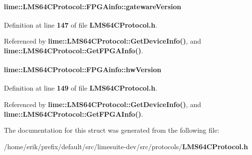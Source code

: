 \paragraph[{gateware\+Version}]{ lime\+::\+L\+M\+S64\+C\+Protocol\+::\+F\+P\+G\+Ainfo\+::gateware\+Version}\label{structlime_1_1LMS64CProtocol_1_1FPGAinfo_a0dc0c0bc9dc12b92fee87099ff76bca5}


Definition at line {\bf 147} of file {\bf L\+M\+S64\+C\+Protocol.\+h}.



Referenced by {\bf lime\+::\+L\+M\+S64\+C\+Protocol\+::\+Get\+Device\+Info()}, and {\bf lime\+::\+L\+M\+S64\+C\+Protocol\+::\+Get\+F\+P\+G\+A\+Info()}.

\paragraph[{hw\+Version}]{ lime\+::\+L\+M\+S64\+C\+Protocol\+::\+F\+P\+G\+Ainfo\+::hw\+Version}\label{structlime_1_1LMS64CProtocol_1_1FPGAinfo_a3e46d51fa4aaf48dd9f48c017f62a2f1}


Definition at line {\bf 149} of file {\bf L\+M\+S64\+C\+Protocol.\+h}.



Referenced by {\bf lime\+::\+L\+M\+S64\+C\+Protocol\+::\+Get\+Device\+Info()}, and {\bf lime\+::\+L\+M\+S64\+C\+Protocol\+::\+Get\+F\+P\+G\+A\+Info()}.



The documentation for this struct was generated from the following file\+:\begin{DoxyCompactItemize}
\item 
/home/erik/prefix/default/src/limesuite-\/dev/src/protocols/{\bf L\+M\+S64\+C\+Protocol.\+h}\end{DoxyCompactItemize}
